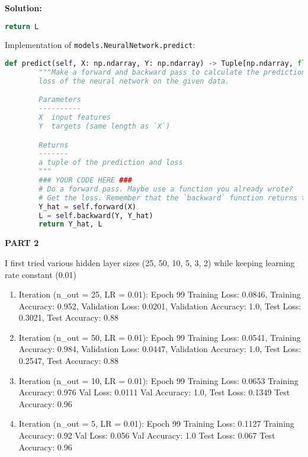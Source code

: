 \documentclass{article}
\newenvironment{solution}{\color{blue} \smallskip \textbf{Solution:}}{}
\begin{document}
\begin{solution}
\begin{lstlisting}[language=Python]
        return L 

\end{lstlisting}

Implementation of \texttt{models.NeuralNetwork.predict}:

\begin{lstlisting}[language=Python]
    def predict(self, X: np.ndarray, Y: np.ndarray) -> Tuple[np.ndarray, float]:
        """Make a forward and backward pass to calculate the predictions and
        loss of the neural network on the given data.

        Parameters
        ----------
        X  input features
        Y  targets (same length as `X`)

        Returns
        -------
        a tuple of the prediction and loss
        """
        ### YOUR CODE HERE ###
        # Do a forward pass. Maybe use a function you already wrote?
        # Get the loss. Remember that the `backward` function returns the loss.
        Y_hat = self.forward(X)
        L = self.backward(Y, Y_hat)
        return Y_hat, L

\end{lstlisting}


\textbf{PART 2}

I first tried various hidden layer sizes (25, 50, 10, 5, 3, 2) while keeping learning rate constant (0.01)

	\begin{enumerate}
	
    \item Iteration (n\_out = 25, LR = 0.01): Epoch 99 Training Loss: 0.0846, Training Accuracy: 0.952, Validation Loss: 0.0201, Validation Accuracy: 1.0, Test Loss: 0.3021, Test Accuracy: 0.88

    \item Iteration (n\_out = 50, LR = 0.01): Epoch 99 Training Loss: 0.0541, Training Accuracy: 0.984, Validation Loss: 0.0447, Validation Accuracy: 1.0, Test Loss: 0.2547, Test Accuracy: 0.88
    
    \item Iteration (n\_out = 10, LR = 0.01): Epoch 99 Training Loss: 0.0653 Training Accuracy: 0.976 Val Loss: 0.0111 Val Accuracy: 1.0, Test Loss: 0.1349 Test Accuracy: 0.96
    
    \item Iteration (n\_out = 5, LR = 0.01): Epoch 99 Training Loss: 0.1127 Training Accuracy: 0.92 Val Loss: 0.056 Val Accuracy: 1.0
Test Loss: 0.067 Test Accuracy: 0.96


\end{enumerate}
\end{solution}
\end{document}
